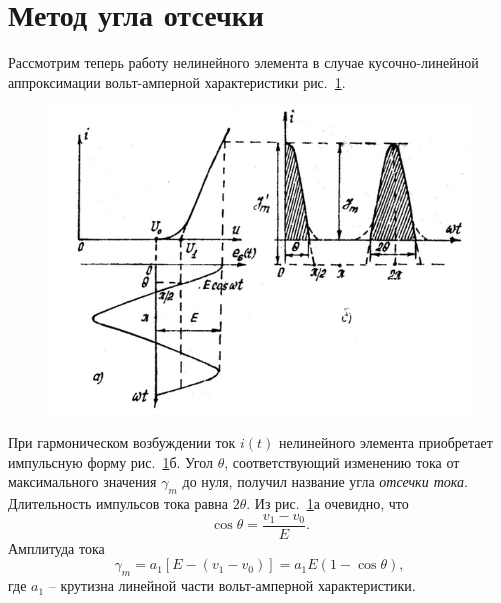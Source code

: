 \section{Метод угла отсечки}
Рассмотрим теперь работу нелинейного элемента в случае кусочно-линейной аппроксимации вольт-амперной характеристики рис.~\ref{pic:5}.
\begin{figure}[h!]
	\centering
	\includegraphics[width=0.7\linewidth]{picture/pic5.jpg}
	\caption{}
	\label{pic:5}
\end{figure}
При гармоническом возбуждении ток $i(t)$ нелинейного элемента приобретает импульсную форму рис.~\ref{pic:5}б. Угол $\theta$, соответствующий изменению тока от максимального значения $\gamma_m$ до нуля, получил название угла \textit{отсечки тока}. Длительность импульсов тока равна $2\theta$. Из рис.~\ref{pic:5}а очевидно, что
\begin{equation}
\cos\theta=\frac{v_1-v_0}{E}.
\label{eq:13}
\end{equation}
Амплитуда тока
\begin{equation}
\gamma_m=a_1[E-(v_1-v_0)]=a_1E(1-\cos\theta),
\label{eq:14}
\end{equation}
где $a_1$ -- крутизна линейной части вольт-амперной характеристики.

